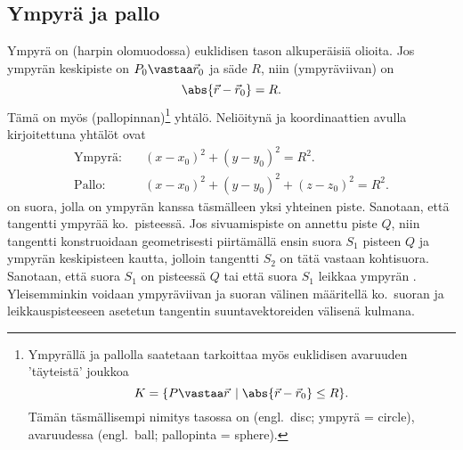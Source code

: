 \subsection{Ympyrä ja pallo}
 

Ympyrä on (harpin olomuodossa) euklidisen tason alkuperäisiä olioita. Jos ympyrän keskipiste
on $P_0\vastaa\vec r_0$ ja säde $R$, niin  (ympyräviivan)  on
\[
\abs{\vec r-\vec r_0} = R.
\]
Tämä on myös  (pallopinnan)\footnote[2]{Ympyrällä ja pallolla saatetaan tarkoittaa 
myös euklidisen avaruuden 'täyteistä' joukkoa
\[
K = \{P\vastaa\vec r\, \mid \abs{\vec r-\vec r_0} \le R\}.
\]
Tämän täsmällisempi nimitys tasossa on  (engl.\ disc; ympyrä = circle), avaruudessa
 (engl.\ ball; pallopinta = sphere).  } yhtälö.
Neliöitynä ja koordinaattien avulla kirjoitettuna yhtälöt ovat
\begin{align*}
\text{Ympyrä:} \quad &(x-x_0)^2+(y-y_0)^2=R^2. \\
\text{Pallo:}  \quad &(x-x_0)^2+(y-y_0)^2+(z-z_0)^2=R^2.
\end{align*}
%
 on suora, jolla on ympyrän kanssa täsmälleen yksi yhteinen piste. 
Sanotaan, että tangentti  ympyrää ko.\ pisteessä. Jos sivuamispiste on annettu
piste $Q$, niin tangentti konstruoidaan geometrisesti piirtämällä ensin suora $S_1$ pisteen
$Q$ ja ympyrän keskipisteen kautta, jolloin tangentti $S_2$ on tätä vastaan kohtisuora. 
Sanotaan, että suora $S_1$ on
%
 pisteessä $Q$ tai että suora $S_1$
leikkaa ympyrän . Yleisemminkin voidaan ympyräviivan ja suoran välinen 
%
 määritellä ko.\ suoran ja leikkauspisteeseen asetetun tangentin
suuntavektoreiden välisenä kulmana.

